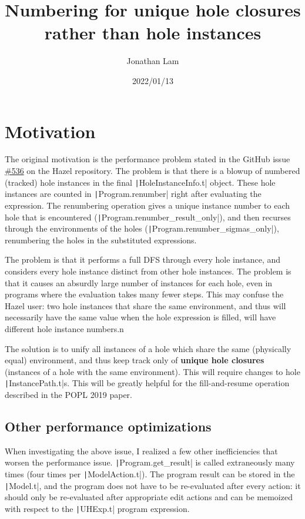 \documentclass{article}
\title{Numbering for unique hole closures \\rather than hole instances}
\author{Jonathan Lam}
\date{2022/01/13}
\begin{document}
\maketitle{}

\section{Motivation}
The original motivation is the performance problem stated in the GitHub issue \href{https://github.com/hazelgrove/hazel/issues/536}{\#536} on the Hazel repository. The problem is that there is a blowup of numbered (tracked) hole instances in the final \texttt|HoleInstanceInfo.t| object. These hole instances are counted in \texttt|Program.renumber| right after evaluating the expression. The renumbering operation gives a unique instance number to each hole that is encountered (\texttt|Program.renumber_result_only|), and then recurses through the environments of the holes (\texttt|Program.renumber_sigmas_only|), renumbering the holes in the substituted expressions.

The problem is that it performs a full DFS through every hole instance, and considers every hole instance distinct from other hole instances. The problem is that it causes an absurdly large number of instances for each hole, even in programs where the evaluation takes many fewer steps. This may confuse the Hazel user: two hole instances that share the same environment, and thus will necessarily have the same value when the hole expression is filled, will have different hole instance numbers.n

The solution is to unify all instances of a hole which share the same (physically equal) environment, and thus keep track only of \textbf{unique hole closures} (instances of a hole with the same environment). This will require changes to hole \texttt|InstancePath.t|s. This will be greatly helpful for the fill-and-resume operation described in the POPL 2019 paper.

\subsection{Other performance optimizations}
When investigating the above issue, I realized a few other inefficiencies that worsen the performance issue. \texttt|Program.get_result| is called extraneously many times (four times per \texttt|ModelAction.t|). The program result can be stored in the \texttt|Model.t|, and the program does not have to be re-evaluated after every action: it should only be re-evaluated after appropriate edit actions and can be memoized with respect to the \texttt|UHExp.t| program expression.
\end{document}
